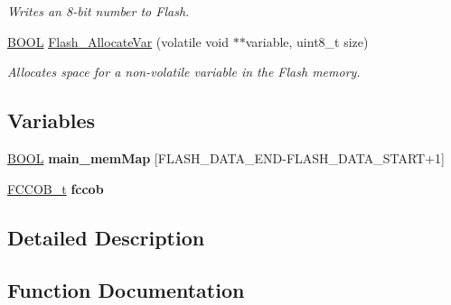 \begin{DoxyCompactItemize}
\begin{DoxyCompactList}\small\item\em Writes an 8-\/bit number to Flash. \end{DoxyCompactList}\item 
\hyperlink{types_8h_a3e5b8192e7d9ffaf3542f1210aec18dd}{B\+O\+O\+L} \hyperlink{group___flash__module_ga9dd401bbfa0b2006ef48889660ef84f2}{Flash\+\_\+\+Allocate\+Var} (volatile void $\ast$$\ast$variable, uint8\+\_\+t size)
\begin{DoxyCompactList}\small\item\em Allocates space for a non-\/volatile variable in the Flash memory. \end{DoxyCompactList}\end{DoxyCompactItemize}
\subsection*{Variables}
\begin{DoxyCompactItemize}
\item 
\hypertarget{group___flash__module_ga9e787c402f777b378b9170a4995e497d}{}\hyperlink{types_8h_a3e5b8192e7d9ffaf3542f1210aec18dd}{B\+O\+O\+L} {\bfseries main\+\_\+mem\+Map} \mbox{[}F\+L\+A\+S\+H\+\_\+\+D\+A\+T\+A\+\_\+\+E\+N\+D-\/F\+L\+A\+S\+H\+\_\+\+D\+A\+T\+A\+\_\+\+S\+T\+A\+R\+T+1\mbox{]}\label{group___flash__module_ga9e787c402f777b378b9170a4995e497d}

\item 
\hypertarget{group___flash__module_ga0fd666b25871878c069a6af4429b8c13}{}\hyperlink{struct_f_c_c_o_b__t}{F\+C\+C\+O\+B\+\_\+t} {\bfseries fccob}\label{group___flash__module_ga0fd666b25871878c069a6af4429b8c13}

\end{DoxyCompactItemize}


\subsection{Detailed Description}


\subsection{Function Documentation}
\hypertarget{group___flash__module_ga9dd401bbfa0b2006ef48889660ef84f2}{}
